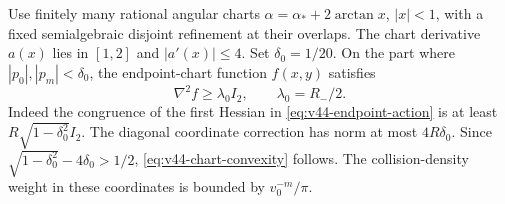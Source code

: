 Use finitely many rational angular charts
$\alpha=\alpha_*+2\arctan x$, $|x|<1$, with a fixed semialgebraic disjoint
refinement at their overlaps. The chart derivative $a(x)$ lies in
$[1,2]$ and $|a'(x)|\le4$. Set $\delta_0=1/20$. On the part where
$|p_0|,|p_m|<\delta_0$, the endpoint-chart function $f(x,y)$ satisfies
\begin{equation}\label{eq:v44-chart-convexity}
 \nabla^2 f\ge\lambda_0 I_2,\qquad \lambda_0=R_-/2.
\end{equation}
Indeed the congruence of the first Hessian in
\eqref{eq:v44-endpoint-action} is at least
$R\sqrt{1-\delta_0^2}I_2$. The diagonal coordinate correction has norm
at most $4R\delta_0$. Since $\sqrt{1-\delta_0^2}-4\delta_0>1/2$,
\eqref{eq:v44-chart-convexity} follows. The collision-density weight
in these coordinates is bounded by $v_0^{-m}/\pi$.

